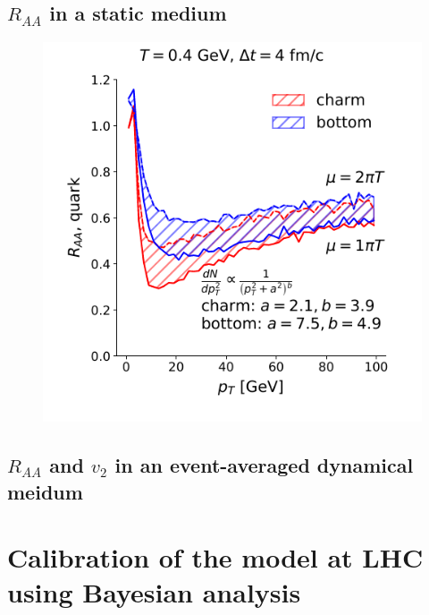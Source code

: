 \documentclass[aps, prc, reprint, amsmath, groupedaddress, nofootinbib]{revtex4-1}
\begin{document}
\subsection{$R_{AA}$ in a static medium}
\begin{figure}
\includegraphics[width=\columnwidth]{Box_Raa.pdf}
\end{figure}

\subsection{$R_{AA}$ and $v_2$ in an event-averaged dynamical meidum}


\section{Calibration of the model at LHC using Bayesian analysis}
\end{document}
